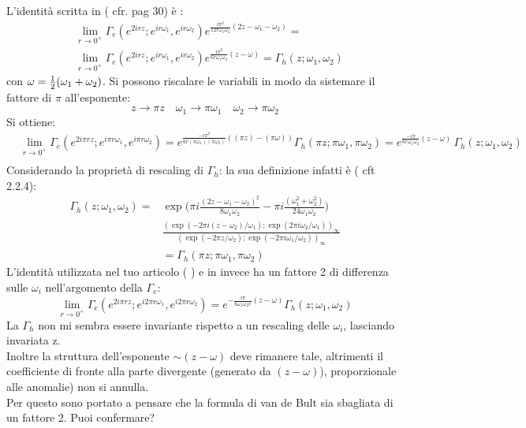 \documentclass[a4paper,12pt]{report}
\begin{document}
L'identità scritta in ( cfr. \citep{vanDeBult:2007} pag 30) è :
\begin{align}
&\lim_{r \rightarrow 0^+} \Gamma_e (e^{ 2 i r z}; e^{ i  r \omega_1} , e^{i r  \omega_2})
 e^{\frac{ i \pi^2 }{12  r \omega_1 \omega_2 } ( 2 z - \omega_1 -\omega_2)} =\\
&\lim_{r \rightarrow 0^+} \Gamma_e (e^{ 2 i r z}; e^{ i  r \omega_1} , e^{i r  \omega_2}) 
 e^{\frac{ i \pi^2 }{6 r \omega_1 \omega_2 } (  z - \omega )} = \Gamma_h(z;\omega_1 , \omega_2)
\end{align}
con $ \omega = {1 \over 2 } ( \omega_1 + \omega_2)$.
Si possono riscalare le variabili in modo da sistemare il fattore di $\pi$ all'esponente:
$$
 z \rightarrow \pi z \quad  \omega_1 \rightarrow  \pi \omega_1 \quad  \omega_2 \rightarrow  \pi \omega_2 
$$
Si ottiene:
\begin{align*}
&\lim_{r \rightarrow 0^+} \Gamma_e (e^{ 2 i \pi r z}; e^{ i \pi  r \omega_1} , e^{i \pi r  \omega_2}) =
 e^{\frac{ - i \pi^2 }{6 r  (\pi \omega_1) (\pi \omega_2) } ( (\pi z) - (\pi \omega))}\Gamma_h(\pi z; \pi \omega_1 ,\pi \omega_2) =   e^{\frac{ - i \pi }{6 r \omega_1 \omega_2 } (  z - \omega )} \, \Gamma_h ( z; \omega_1 , \omega_2 ) \\
\end{align*}
Considerando la proprietà di rescaling di $\Gamma_h$: la sua definizione infatti è ( cft \citep{vanDeBult:2007} 2.2.4):
\begin{align}
 \Gamma_h ( z;\omega_1, \omega_2) =& \exp \bigg( \pi i \frac{(2z-\omega_1 - \omega_2)^2}{8 \omega_1 \omega_2 } - \pi i \frac{(\omega_1^2 + \omega_2^2)}{ 24 \omega_1 \omega_2} \bigg) \\
 & \frac{ (\exp( -2 \pi i (z-\omega_2)/ \omega_1 ); \exp( 2 \pi i \omega_2 / \omega_1 ))_{\infty}}
 { (\exp( -2 \pi z / \omega_2 ); \exp( - 2 \pi i \omega_1 / \omega_2))_{\infty}}\\
 & = \Gamma_h ( \pi z; \pi \omega_1, \pi \omega_2)
\end{align}
L'identità utilizzata nel tuo articolo ( \citep{Amariti:2014iza}) e in \citep{Aharony:2013dha} invece ha un fattore 2 di differenza sulle $\omega_i$ nell'argomento della $\Gamma_e$:
$$
\lim_{r \rightarrow 0^+} \Gamma_e (e^{ 2 i \pi r z}; e^{ i 2 \pi  r \omega_1} , e^{i  2 \pi r  \omega_2}) = e^{- \frac{i \pi}{6 \omega_1 \omega_2 r } ( z - \omega)} \Gamma_h(z; \omega_1, \omega_2)
$$
La $\Gamma_h$ non mi sembra essere invariante rispetto a un rescaling delle $\omega_i$, lasciando invariata z. \\
Inoltre la struttura dell'esponente $ \sim (z-\omega)$ deve rimanere tale, altrimenti il coefficiente di fronte alla parte divergente (generato da $(z-\omega)$), proporzionale alle anomalie) non si annulla.\\
Per questo sono portato a pensare che la formula di van de Bult sia sbagliata di un fattore 2.
Puoi confermare?



\end{document}
